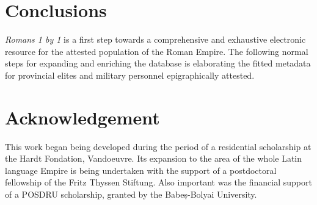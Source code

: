 \documentclass[amsthm,ebook]{saparticle}
\begin{document}
\section{Conclusions}

\noindent \emph{Romans 1 by 1} is a first step towards a comprehensive and exhaustive electronic resource for the attested population of
the Roman Empire. The following normal steps for expanding and enriching the database is elaborating the fitted
metadata for provincial elites and military personnel epigraphically attested.



\section*{Acknowledgement}
This work began being developed during the period of a residential scholarship at the Hardt Fondation, Vandoeuvre. Its
expansion to the area of the whole Latin language Empire is being undertaken with the support of a postdoctoral
fellowship of the Fritz Thyssen Stiftung. Also important was the financial support of a POSDRU scholarship, granted by
the Babeș-Bolyai University.




\end{document}
